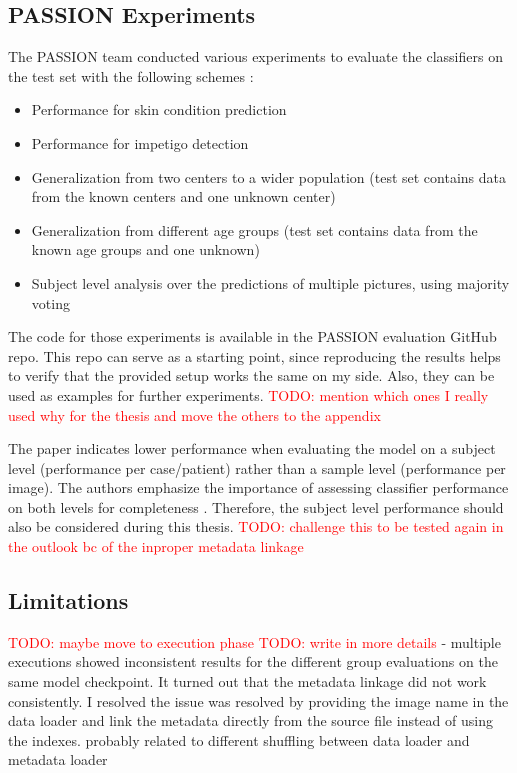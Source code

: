 \documentclass[12pt, a4paper, oneside]{book}   	%
\renewcommand{\todo}[1]{\textcolor{red}{TODO: #1}}
\begin{document}
			\subsection{PASSION Experiments}
			  The PASSION team conducted various experiments to evaluate the classifiers on the test set with the following schemes \autocite{Gottfrois2024}:
			  \begin{itemize}
			  	\item Performance for skin condition prediction
			  	\item Performance for impetigo detection
			  	\item Generalization from two centers to a wider population (test set contains data from the known centers and one unknown center)
			  	\item Generalization from different age groups (test set contains data from the known age groups and one unknown)
			  	\item Subject level analysis over the predictions of multiple pictures, using majority voting
			  \end{itemize}
			  
			  The code for those experiments is available in the PASSION evaluation GitHub repo. This repo can serve as a starting point, since reproducing the results helps to verify that the provided setup works the same on my side. Also, they can be used as examples for further experiments. \todo{mention which ones I really used why for the thesis and move the others to the appendix}
			  
			  The paper indicates lower performance when evaluating the model on a subject level (performance per case/patient) rather than a sample level (performance per image). The authors emphasize the importance of assessing classifier performance on both levels for completeness \autocite{Gottfrois2024}. Therefore, the subject level performance should also be considered during this thesis.
			  \todo{challenge this to be tested again in the outlook bc of the inproper metadata linkage}
	
	
		\subsection{Limitations}
				\todo{maybe move to execution phase}
				\todo{write in more details}
			   - multiple executions showed inconsistent results for the different group evaluations on the same model checkpoint. It turned out that the metadata linkage did not work consistently. I resolved the issue was resolved by providing the image name in the data loader and link the metadata directly from the source file instead of using the indexes. probably related to different shuffling between data loader and metadata loader
		
\end{document}
